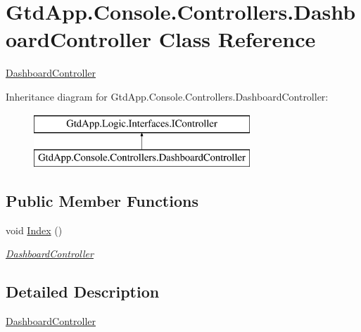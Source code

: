 \hypertarget{class_gtd_app_1_1_console_1_1_controllers_1_1_dashboard_controller}{}\section{Gtd\+App.\+Console.\+Controllers.\+Dashboard\+Controller Class Reference}
\label{class_gtd_app_1_1_console_1_1_controllers_1_1_dashboard_controller}


\mbox{\hyperlink{class_gtd_app_1_1_console_1_1_controllers_1_1_dashboard_controller}{Dashboard\+Controller}}  


Inheritance diagram for Gtd\+App.\+Console.\+Controllers.\+Dashboard\+Controller\+:\begin{figure}[H]
\begin{center}
\leavevmode
\includegraphics[height=2.000000cm]{class_gtd_app_1_1_console_1_1_controllers_1_1_dashboard_controller}
\end{center}
\end{figure}
\subsection*{Public Member Functions}
\begin{DoxyCompactItemize}
\item 
void \mbox{\hyperlink{class_gtd_app_1_1_console_1_1_controllers_1_1_dashboard_controller_a3941276b17a18246e4c81c6abd9cebeb}{Index}} ()
\begin{DoxyCompactList}\small\item\em \mbox{\hyperlink{class_gtd_app_1_1_console_1_1_controllers_1_1_dashboard_controller}{Dashboard\+Controller}} \end{DoxyCompactList}\end{DoxyCompactItemize}


\subsection{Detailed Description}
\mbox{\hyperlink{class_gtd_app_1_1_console_1_1_controllers_1_1_dashboard_controller}{Dashboard\+Controller}} 



